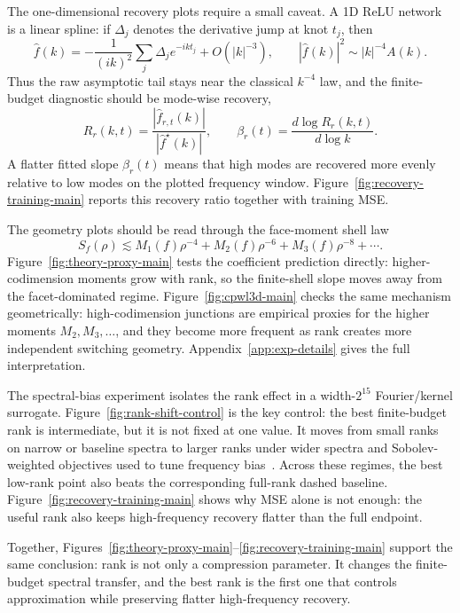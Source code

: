 \documentclass{article}
\begin{document}
The one-dimensional recovery plots require a small caveat. A 1D ReLU network is a linear spline: if $\Delta_j$ denotes the derivative jump at knot $t_j$, then
\begin{equation}
\widehat f(k)=
-\frac{1}{(ik)^2}\sum_j \Delta_j e^{-ikt_j}
+O(|k|^{-3}),
\qquad
|\widehat f(k)|^2\sim |k|^{-4}A(k).
\end{equation}
Thus the raw asymptotic tail stays near the classical $k^{-4}$ law, and the finite-budget diagnostic should be mode-wise recovery,
\begin{equation}
R_r(k,t)=\frac{|\widehat f_{r,t}(k)|}{|\widehat f^\star(k)|},
\qquad
\beta_r(t)=\frac{d\log R_r(k,t)}{d\log k}.
\end{equation}
A flatter fitted slope $\beta_r(t)$ means that high modes are recovered more evenly relative to low modes on the plotted frequency window. Figure~\ref{fig:recovery-training-main} reports this recovery ratio together with training MSE.

The geometry plots should be read through the face-moment shell law
\begin{equation}
S_f(\rho)\lesssim M_1(f)\rho^{-4}+M_2(f)\rho^{-6}+M_3(f)\rho^{-8}+\cdots .
\end{equation}
Figure~\ref{fig:theory-proxy-main} tests the coefficient prediction directly: higher-codimension moments grow with rank, so the finite-shell slope moves away from the facet-dominated regime. Figure~\ref{fig:cpwl3d-main} checks the same mechanism geometrically: high-codimension junctions are empirical proxies for the higher moments $M_2,M_3,\ldots$, and they become more frequent as rank creates more independent switching geometry. Appendix~\ref{app:exp-details} gives the full interpretation.

The spectral-bias experiment isolates the rank effect in a width-$2^{15}$ Fourier/kernel surrogate. Figure~\ref{fig:rank-shift-control} is the key control: the best finite-budget rank is intermediate, but it is not fixed at one value. It moves from small ranks on narrow or baseline spectra to larger ranks under wider spectra and Sobolev-weighted objectives used to tune frequency bias~\cite{yu2022tuning}. Across these regimes, the best low-rank point also beats the corresponding full-rank dashed baseline. Figure~\ref{fig:recovery-training-main} shows why MSE alone is not enough: the useful rank also keeps high-frequency recovery flatter than the full endpoint.

Together, Figures~\ref{fig:theory-proxy-main}--\ref{fig:recovery-training-main} support the same conclusion: rank is not only a compression parameter. It changes the finite-budget spectral transfer, and the best rank is the first one that controls approximation while preserving flatter high-frequency recovery.
\end{document}
